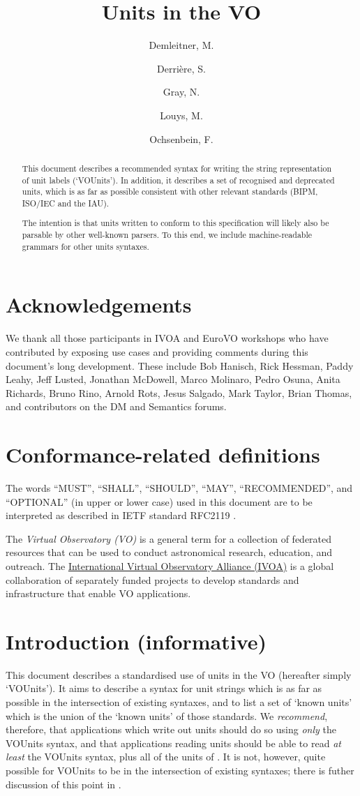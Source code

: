 \documentclass[11pt,a4paper]{ivoa}
\title{Units in the VO}
\author{Demleitner, M.}
\author{Derri\`ere, S.}
\author{Gray, N.}
\author{Louys, M.}
\author{Ochsenbein, F.}
\begin{document}
\begin{abstract}
This document describes a recommended syntax for writing the string
representation of unit labels (`VOUnits').  In addition, it describes
a set of recognised and deprecated units, which is as far as possible
consistent with other relevant standards (BIPM, ISO/IEC and the IAU).

The intention is that units written to conform to this specification
will likely also be parsable by other well-known parsers.  To this
end, we include machine-readable grammars for other units syntaxes.
\end{abstract}



\section*{Acknowledgements}

We thank all those participants in IVOA and EuroVO workshops who have
contributed by exposing use cases and providing comments during this
document's long development.  These include
Bob Hanisch,
Rick Hessman,
Paddy Leahy,
Jeff Lusted,
Jonathan McDowell,
Marco Molinaro,
Pedro Osuna,
Anita Richards,
Bruno Rino,
Arnold Rots,
Jesus Salgado,
Mark Taylor,
Brian Thomas,
and contributors on the DM and Semantics forums.

\section*{Conformance-related definitions}

The words ``MUST'', ``SHALL'', ``SHOULD'', ``MAY'', ``RECOMMENDED'', and
``OPTIONAL'' (in upper or lower case) used in this document are to be
interpreted as described in IETF standard RFC2119 \citep{std:RFC2119}.

The \emph{Virtual Observatory (VO)} is a
general term for a collection of federated resources that can be used
to conduct astronomical research, education, and outreach.
The \href{https://www.ivoa.net}{International
Virtual Observatory Alliance (IVOA)} is a global
collaboration of separately funded projects to develop standards and
infrastructure that enable VO applications.


\section{Introduction (informative)}
\label{sec:intro}

This document describes a standardised use of units in the VO
(hereafter simply `VOUnits').  It aims to describe a syntax for unit
strings which is as far as possible in the intersection of existing
syntaxes, and to list a set of `known units' which is
the union of the `known units' of those standards.
We \emph{recommend}, therefore, that applications which write out
units should do so using \emph{only} the VOUnits syntax, and that
applications reading units should be able to read \emph{at least} the
VOUnits syntax, plus all of the units of .
It is not, however, quite possible for VOUnits to be in the
intersection of existing syntaxes; there is futher discussion of this
point in .
\end{document}
